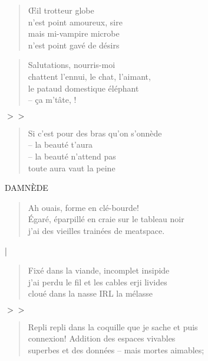 \newpage
{}
  \begin{verse}
    Œil trotteur globe\\
    n’est point amoureux, sire\\
    mais mi-vampire microbe\\
    n’est point gavé de désirs
  \end{verse}
  \begin{verse}
    Salutations, nourris-moi\\
    chattent l’ennui, le chat, l’aimant,\\
    le pataud domestique éléphant\\
    -- ça m’tâte, !
  \end{verse}
  \begin{center}
    \textit{$>>$}
  \end{center}
  \begin{verse}
    Si c’est pour des bras qu’on s’onnède\\
    -- la beauté t’aura\\
    -- la beauté n’attend pas\\
    toute aura vaut la peine
  \end{verse}
  \begin{center}
    DAMNÈDE
  \end{center}

  \begin{verse}
    Ah ouais, forme en clé-bourde!\\
    Égaré, éparpillé en craie sur le tableau noir\\
    j’ai des vieilles trainées de meatspace.
  \end{verse}
  \begin{center}
    |
  \end{center}
  \begin{verse}
    Fixé dans la viande, incomplet insipide\\
    j’ai perdu le fil et les cables erji livides\\
    cloué dans la nasse IRL la mélasse
  \end{verse}
  \begin{center}
    \textit{$>>$}
  \end{center}
  \begin{verse}
    Repli repli dans la coquille que je sache et puis\\
    connexion! Addition des espaces vivables\\
    superbes et des données -- mais mortes aimables;
  \end{verse}

